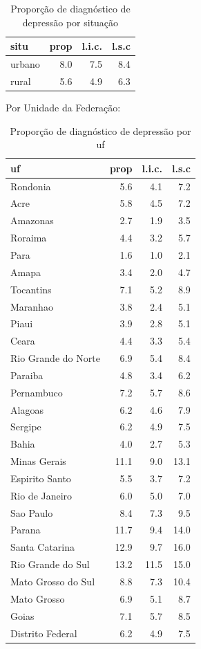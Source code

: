 \documentclass[]{book}
\theoremstyle{definition}
\theoremstyle{definition}
\theoremstyle{definition}
\theoremstyle{remark}
\begin{document}
\begin{table}

\caption{\label{tab:unnamed-chunk-47}Proporção de diagnóstico de depressão por situação}
\centering
\begin{tabular}[t]{lrrr}
\toprule
situ & prop & l.i.c. & l.s.c\\
\midrule
urbano & 8.0 & 7.5 & 8.4\\
rural & 5.6 & 4.9 & 6.3\\
\bottomrule
\end{tabular}
\end{table}

Por Unidade da Federação:

\begin{table}

\caption{\label{tab:unnamed-chunk-49}Proporção de diagnóstico de depressão por uf}
\centering
\begin{tabular}[t]{lrrr}
\toprule
uf & prop & l.i.c. & l.s.c\\
\midrule
Rondonia & 5.6 & 4.1 & 7.2\\
Acre & 5.8 & 4.5 & 7.2\\
Amazonas & 2.7 & 1.9 & 3.5\\
Roraima & 4.4 & 3.2 & 5.7\\
Para & 1.6 & 1.0 & 2.1\\
\addlinespace
Amapa & 3.4 & 2.0 & 4.7\\
Tocantins & 7.1 & 5.2 & 8.9\\
Maranhao & 3.8 & 2.4 & 5.1\\
Piaui & 3.9 & 2.8 & 5.1\\
Ceara & 4.4 & 3.3 & 5.4\\
\addlinespace
Rio Grande do Norte & 6.9 & 5.4 & 8.4\\
Paraiba & 4.8 & 3.4 & 6.2\\
Pernambuco & 7.2 & 5.7 & 8.6\\
Alagoas & 6.2 & 4.6 & 7.9\\
Sergipe & 6.2 & 4.9 & 7.5\\
\addlinespace
Bahia & 4.0 & 2.7 & 5.3\\
Minas Gerais & 11.1 & 9.0 & 13.1\\
Espirito Santo & 5.5 & 3.7 & 7.2\\
Rio de Janeiro & 6.0 & 5.0 & 7.0\\
Sao Paulo & 8.4 & 7.3 & 9.5\\
\addlinespace
Parana & 11.7 & 9.4 & 14.0\\
Santa Catarina & 12.9 & 9.7 & 16.0\\
Rio Grande do Sul & 13.2 & 11.5 & 15.0\\
Mato Grosso do Sul & 8.8 & 7.3 & 10.4\\
Mato Grosso & 6.9 & 5.1 & 8.7\\
\addlinespace
Goias & 7.1 & 5.7 & 8.5\\
Distrito Federal & 6.2 & 4.9 & 7.5\\
\bottomrule
\end{tabular}
\end{table}
\end{document}
